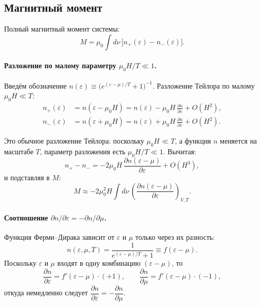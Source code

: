 \documentclass[12pt,a4paper]{article}
\begin{document}
\subsection*{Магнитный момент}

Полный магнитный момент системы:
\begin{equation}
    M = \mu_0 \int d\nu\, \bigl[n_+(\varepsilon) - n_-(\varepsilon)\bigr].
\end{equation}

\paragraph{Разложение по малому параметру $\mu_0 H / T \ll 1$.}

Введём обозначение $n(\varepsilon) \equiv \bigl(e^{(\varepsilon-\mu)/T}+1\bigr)^{-1}$. Разложение Тейлора по малому $\mu_0 H \ll T$:
\begin{align}
    n_+(\varepsilon) &= n(\varepsilon - \mu_0 H) = n(\varepsilon) - \mu_0 H\,\frac{\partial n}{\partial \varepsilon} + O(H^2), \\
    n_-(\varepsilon) &= n(\varepsilon + \mu_0 H) = n(\varepsilon) + \mu_0 H\,\frac{\partial n}{\partial \varepsilon} + O(H^2).
\end{align}

Это обычное разложение Тейлора: поскольку $\mu_0 H \ll T$, а функция $n$ меняется на масштабе $T$, параметр разложения есть $\mu_0 H / T \ll 1$. Вычитая:
\begin{equation}
    n_+ - n_- = -2\mu_0 H\,\frac{\partial n(\varepsilon-\mu)}{\partial \varepsilon} + O(H^3),
\end{equation}
и подставляя в $M$:
\begin{equation}
    M \approx -2\mu_0^2 H \int d\nu\, \left(\frac{\partial n(\varepsilon-\mu)}{\partial \varepsilon}\right)_{V,T}.
\end{equation}

\paragraph{Соотношение $\partial n/\partial\varepsilon = -\partial n/\partial\mu$.}

Функция Ферми–Дирака зависит от $\varepsilon$ и $\mu$ только через их разность:
\begin{equation}
    n(\varepsilon,\mu,T) = \frac{1}{e^{(\varepsilon-\mu)/T}+1} \equiv f(\varepsilon - \mu).
\end{equation}
Поскольку $\varepsilon$ и $\mu$ входят в одну комбинацию $(\varepsilon - \mu)$, то
\begin{equation}
    \frac{\partial n}{\partial \varepsilon} = f'(\varepsilon-\mu)\cdot(+1), \qquad
    \frac{\partial n}{\partial \mu}  = f'(\varepsilon-\mu)\cdot(-1),
\end{equation}
откуда немедленно следует $\dfrac{\partial n}{\partial \varepsilon} = -\dfrac{\partial n}{\partial \mu}$.
\end{document}
